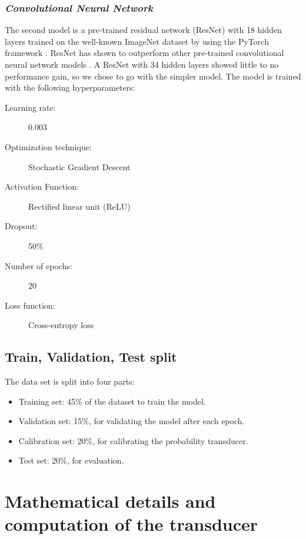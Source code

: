 \documentclass[\ifafour a4paper,12pt,\else a5paper,10pt,\fi%
onecolumn,oneside,article,%
british%
]{memoir}
\theoremstyle{remark}
\theoremstyle{innote}
\renewcommand*{\|}[1][]{\nonscript\:#1\vert\nonscript\:\mathopen{}}
\begin{document}
\subsubsection{\textit{Convolutional Neural Network}} 
The second model is a pre-trained residual network (ResNet) \autocites{heetal2016} with 18 hidden layers trained on the well-known ImageNet dataset  \autocites{russakovskyetal2015} by using the PyTorch framework \autocites{paszkeetal2019}. ResNet has shown to outperform other pre-trained convolutional neural network models \autocites{heetal2016}. A ResNet with 34 hidden layers showed little to no performance gain, so we chose to go with the simpler model. The model is trained with the following hyperparameters:
\medskip

\begin{framed}
  \begin{description}
  \item[Learning rate:] 0.003 
  \item[Optimization technique:] Stochastic Gradient Descent 
  \item[Activation Function:] Rectified linear unit (ReLU) 
  \item[Dropout:] 50\% 
  \item[Number of epochs:] 20 
  \item[Loss function:] Cross-entropy loss
  \end{description}
\end{framed}

\subsection{Train, Validation, Test split}

The data set is split into four parts:
\begin{itemize}
\item Training set: 45\% of the dataset to train the model.
\item Validation set: 15\%, for validating the model after each epoch.
\item Calibration set: 20\%, for calibrating the probability transducer.
\item Test set: 20\%, for evaluation.
\end{itemize}


\section{Mathematical details and computation of the transducer}
\label{sec:maths_transducer}
\end{document}
